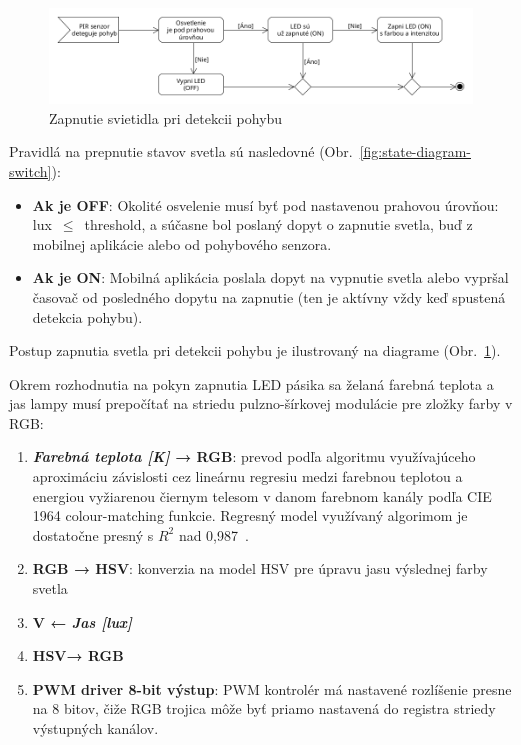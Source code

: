 \documentclass[12pt, a4paper]{article}
\begin{document}
\begin{figure}[h]
    \centering
	\includegraphics[width=\textwidth]{assets/pir-motion-detect.png}
	\caption{Zapnutie svietidla pri detekcii pohybu}
	\label{fig:pir-motion-detect}
\end{figure}

Pravidlá na prepnutie stavov svetla sú nasledovné (Obr.~\ref{fig:state-diagram-switch}):
\begin{itemize}
\item \textbf{Ak je OFF}: Okolité osvelenie musí byť pod nastavenou prahovou úrovňou: lux~$\leq$~threshold, a súčasne bol poslaný dopyt o zapnutie svetla, buď z mobilnej aplikácie alebo od pohybového senzora.
\item \textbf{Ak je ON}: Mobilná aplikácia poslala dopyt na vypnutie svetla alebo vypršal časovač od posledného dopytu na zapnutie (ten je aktívny vždy keď spustená detekcia pohybu).
\end{itemize}
Postup zapnutia svetla pri detekcii pohybu je ilustrovaný na diagrame (Obr.~\ref{fig:pir-motion-detect}).

Okrem rozhodnutia na pokyn zapnutia LED pásika sa želaná farebná teplota a jas lampy musí prepočítať na striedu pulzno-šírkovej modulácie pre zložky farby v RGB:
\begin{enumerate}
\item \textbf{\emph{Farebná teplota [K]} → RGB}: prevod podľa algoritmu využívajúceho aproximáciu závislosti cez lineárnu regresiu medzi farebnou teplotou a energiou vyžiarenou čiernym telesom v danom farebnom kanály podľa CIE 1964 colour-matching funkcie. Regresný model využívaný algorimom je dostatočne presný s $R^2$ nad 0,987~\cite{helland_how_2012}.
\item \textbf{RGB → HSV}: konverzia na model HSV pre úpravu jasu výslednej farby svetla
\item \textbf{V ← \emph{Jas [lux]}}
\item\textbf{HSV→ RGB}
\item \textbf{PWM driver 8-bit výstup}: PWM kontrolér má nastavené rozlíšenie presne na 8 bitov, čiže RGB trojica môže byť priamo nastavená do registra striedy výstupných kanálov.
\end{enumerate}
\end{document}
